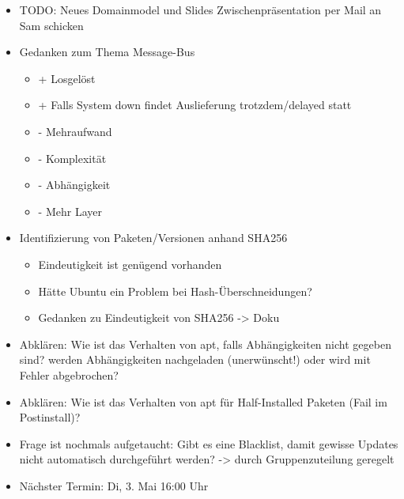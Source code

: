 \documentclass[class=scrbook,crop=false]{standalone}
\begin{document}
	\begin{itemize}
        \item TODO: Neues Domainmodel und Slides Zwischenpräsentation per Mail an Sam schicken
        \item Gedanken zum Thema Message-Bus
        \begin{itemize}
            \item + Losgelöst
            \item + Falls System down findet Auslieferung trotzdem/delayed statt
            \item - Mehraufwand
            \item - Komplexität
            \item - Abhängigkeit
            \item - Mehr Layer
        \end{itemize}
        \item Identifizierung von Paketen/Versionen anhand SHA256
        \begin{itemize}
            \item Eindeutigkeit ist genügend vorhanden
            \item Hätte Ubuntu ein Problem bei Hash-Überschneidungen?
            \item Gedanken zu Eindeutigkeit von SHA256 -> Doku
        \end{itemize}
        \item Abklären: Wie ist das Verhalten von apt, falls Abhängigkeiten nicht gegeben sind? werden Abhängigkeiten nachgeladen (unerwünscht!) oder wird mit Fehler abgebrochen?
        \item Abklären: Wie ist das Verhalten von apt für Half-Installed Paketen (Fail im Postinstall)?
        \item Frage ist nochmals aufgetaucht: Gibt es eine Blacklist, damit gewisse Updates nicht automatisch durchgeführt werden? -> durch Gruppenzuteilung geregelt
        \item Nächster Termin: Di, 3. Mai 16:00 Uhr
    \end{itemize}
\end{document}
